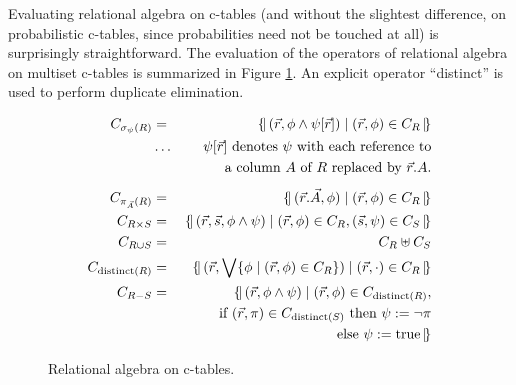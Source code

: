 Evaluating relational algebra on c-tables (and without the slightest difference, on probabilistic c-tables, since probabilities need not be touched at all) is surprisingly straightforward. The evaluation of the operators of relational
algebra on multiset c-tables is summarized in Figure \ref{fig:ctables-relalg}.
An explicit operator ``distinct'' is used to perform duplicate elimination.  


\begin{figure}[t!]
\begin{center}
\begin{eqnarray*}
C_{\sigma_\psi(R)} &=&
   \bagopen (\vec{r}, \phi \land \psi[\vec{r}]) \mid (\vec{r}, \phi) \in C_R
   \bagclose
\\
&\dots& \mbox{$\psi[\vec{r}]$ denotes $\psi$ with each reference to}
\\
&& \mbox{a column $A$ of $R$ replaced by $\vec{r}.A$.}
\\[1ex]
C_{\pi_{\vec{A}}(R)} &=&
   \bagopen (\vec{r}.\vec{A}, \phi) \mid (\vec{r}, \phi) \in C_R \bagclose
\\
C_{R \times S} &=& \bagopen (\vec{r}, \vec{s}, \phi \land \psi) \mid
   (\vec{r}, \phi) \in C_R, (\vec{s}, \psi) \in C_S \bagclose
\\
C_{R \cup S} &=& C_R \uplus C_S
\\
C_{\mathrm{distinct}(R)} &=&
\bagopen (\vec{r},
    \bigvee \{ \phi \mid (\vec{r}, \phi) \in C_R \} )
    \mid (\vec{r}, \cdot) \in C_R \bagclose
\\
C_{R - S} &=& \bagopen (\vec{r}, \phi \land \psi) \mid
   (\vec{r}, \phi) \in C_{\mathrm{distinct}(R)}, \\
&& \quad\quad
   \mbox{if } (\vec{r}, \pi) \in C_{\mathrm{distinct}(S)} \mbox{ then } \psi := \neg \pi \\
&& \quad\quad
   \mbox{else } \psi := \mbox{true} \bagclose
\end{eqnarray*}

\vspace{-3mm}

\caption{Relational algebra on c-tables.}
\label{fig:ctables-relalg}
\end{center}
\end{figure}


